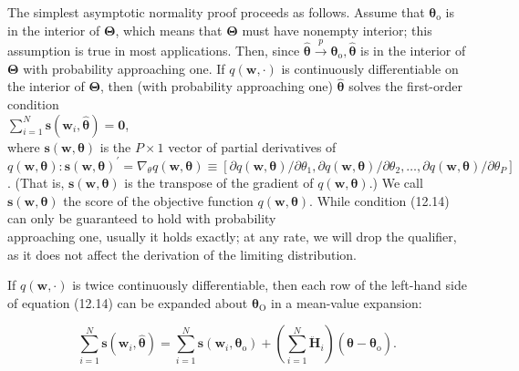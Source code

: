 \documentclass[10pt]{article}
\begin{document}
The simplest asymptotic normality proof proceeds as follows. Assume that $\boldsymbol{\theta}_{\mathrm{o}}$ is in the interior of $\boldsymbol{\Theta}$, which means that $\boldsymbol{\Theta}$ must have nonempty interior; this assumption is true in most applications. Then, since $\hat{\boldsymbol{\theta}} \xrightarrow{p} \boldsymbol{\theta}_{\mathrm{o}}, \hat{\boldsymbol{\theta}}$ is in the interior of $\boldsymbol{\Theta}$ with probability approaching one. If $q(\mathbf{w}, \cdot)$ is continuously differentiable on the interior of $\boldsymbol{\Theta}$, then (with probability approaching one) $\hat{\boldsymbol{\theta}}$ solves the first-order condition\\
$\sum_{i=1}^{N} \mathbf{s}\left(\mathbf{w}_{i}, \hat{\boldsymbol{\theta}}\right)=\mathbf{0}$,\\
where $\mathbf{s}(\mathbf{w}, \boldsymbol{\theta})$ is the $P \times 1$ vector of partial derivatives of $q(\mathbf{w}, \boldsymbol{\theta}): \mathbf{s}(\mathbf{w}, \boldsymbol{\theta})^{\prime}= \nabla_{\theta} q(\mathbf{w}, \boldsymbol{\theta}) \equiv\left[\partial q(\mathbf{w}, \boldsymbol{\theta}) / \partial \theta_{1}, \partial q(\mathbf{w}, \boldsymbol{\theta}) / \partial \theta_{2}, \ldots, \partial q(\mathbf{w}, \boldsymbol{\theta}) / \partial \theta_{P}\right]$. (That is, $\mathbf{s}(\mathbf{w}, \boldsymbol{\theta})$ is the transpose of the gradient of $q(\mathbf{w}, \boldsymbol{\theta})$.) We call $\mathbf{s}(\mathbf{w}, \boldsymbol{\theta})$ the score of the objective function $q(\mathbf{w}, \boldsymbol{\theta})$. While condition (12.14) can only be guaranteed to hold with probability\\
approaching one, usually it holds exactly; at any rate, we will drop the qualifier, as it does not affect the derivation of the limiting distribution.

If $q(\mathbf{w}, \cdot)$ is twice continuously differentiable, then each row of the left-hand side of equation (12.14) can be expanded about $\boldsymbol{\theta}_{\mathrm{O}}$ in a mean-value expansion:


\begin{equation*}
\sum_{i=1}^{N} \mathbf{s}\left(\mathbf{w}_{i}, \hat{\boldsymbol{\theta}}\right)=\sum_{i=1}^{N} \mathbf{s}\left(\mathbf{w}_{i}, \boldsymbol{\theta}_{\mathrm{o}}\right)+\left(\sum_{i=1}^{N} \ddot{\mathbf{H}}_{i}\right)\left(\hat{\boldsymbol{\theta}}-\boldsymbol{\theta}_{\mathrm{o}}\right) . \tag{12.15}
\end{equation*}
\end{document}
